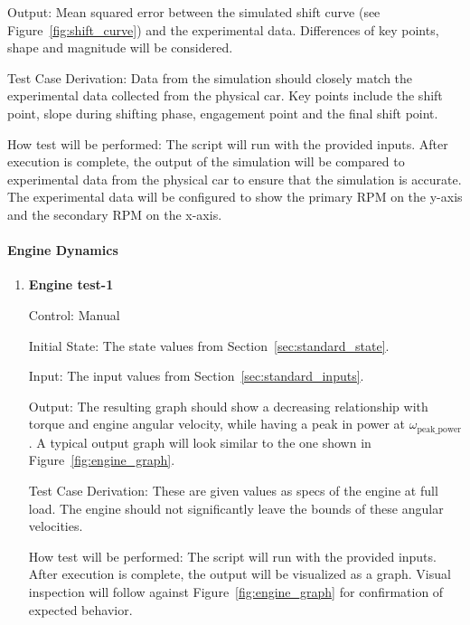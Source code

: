 \documentclass[12pt, titlepage]{article}
\begin{document}
\begin{enumerate}
  Output: Mean squared error between the simulated shift curve (see Figure~\ref{fig:shift_curve}) and the experimental data. Differences of key points, shape and magnitude will be considered.

  Test Case Derivation: Data from the simulation should closely match the experimental data collected from the physical car. Key points include the shift point, slope during shifting phase, engagement point and the final shift point.

  How test will be performed: The script will run with the provided inputs. After execution is complete, the output of the simulation will be compared to experimental data from the physical car to ensure that the simulation is accurate. The experimental data will be configured to show the primary RPM on the y-axis and the secondary RPM on the x-axis.

\end{enumerate}

\paragraph{Engine Dynamics}

\begin{enumerate}

  \item {} \hypertarget{Engine test-1}{\textbf{Engine test-1}} \label{Engine test-1}
  
  Control: Manual
            
  Initial State: The state values from Section~\ref{sec:standard_state}.
  
  Input: The input values from Section~\ref{sec:standard_inputs}.
            
  Output: The resulting graph should show a decreasing relationship with torque and engine angular velocity, while having a peak in power at $\omega_\text{peak\_power}$. A typical output graph will look similar to the one shown in Figure~\ref{fig:engine_graph}.
  
  Test Case Derivation: These are given values as specs of the engine at full load. The engine should not significantly leave the bounds of these angular velocities.
  
  How test will be performed: The script will run with the provided inputs. After execution is complete, the output will be visualized as a graph. Visual inspection will follow against Figure~\ref{fig:engine_graph} for confirmation of expected behavior.

\end{enumerate}
\end{document}
